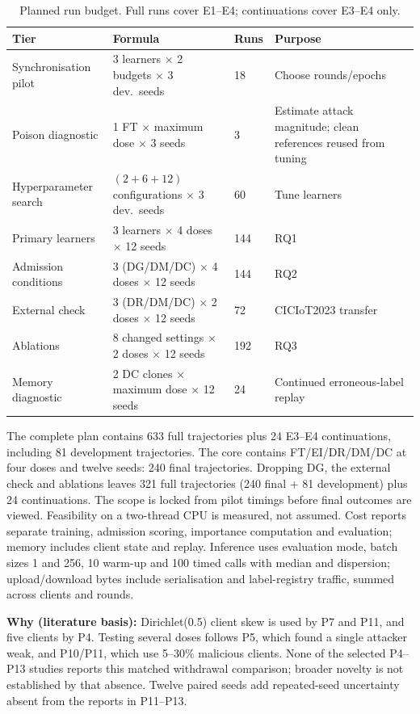 \documentclass[10pt,a4paper]{article}
\newcommand{\why}[1]{\par\nopagebreak[4]\noindent\colorbox{black!5}{\parbox{\dimexpr\linewidth-2\fboxsep}{\small\textbf{Why (literature basis):} #1}}\par}
\begin{document}
\begin{table}[H]
\centering\footnotesize
\caption{Planned run budget. Full runs cover E1--E4; continuations cover E3--E4 only.}
\label{tab:budget}
\begin{tabularx}{\linewidth}{L{3.6cm}L{5.4cm}L{1.0cm}Y}
\toprule
Tier & Formula & Runs & Purpose\\
\midrule
Synchronisation pilot & 3 learners $\times$ 2 budgets $\times$ 3 dev.\ seeds & 18 & Choose rounds/epochs\\
Poison diagnostic & 1 FT $\times$ maximum dose $\times$ 3 seeds & 3 & Estimate attack magnitude; clean references reused from tuning\\
Hyperparameter search & $(2+6+12)$ configurations $\times$ 3 dev.\ seeds & 60 & Tune learners\\
Primary learners & 3 learners $\times$ 4 doses $\times$ 12 seeds & 144 & RQ1\\
Admission conditions & 3 (DG/DM/DC) $\times$ 4 doses $\times$ 12 seeds & 144 & RQ2\\
External check & 3 (DR/DM/DC) $\times$ 2 doses $\times$ 12 seeds & 72 & CICIoT2023 transfer\\
Ablations & 8 changed settings $\times$ 2 doses $\times$ 12 seeds & 192 & RQ3\\
Memory diagnostic & 2 DC clones $\times$ maximum dose $\times$ 12 seeds & 24 & Continued erroneous-label replay\\
\bottomrule
\end{tabularx}
\end{table}
The complete plan contains 633 full trajectories plus 24 E3--E4 continuations, including 81 development trajectories. The core contains FT/EI/DR/DM/DC at four doses and twelve seeds: 240 final trajectories. Dropping DG, the external check and ablations leaves 321 full trajectories (240 final + 81 development) plus 24 continuations. The scope is locked from pilot timings before final outcomes are viewed. Feasibility on a two-thread CPU is measured, not assumed. Cost reports separate training, admission scoring, importance computation and evaluation; memory includes client state and replay. Inference uses evaluation mode, batch sizes 1 and 256, 10 warm-up and 100 timed calls with median and dispersion; upload/download bytes include serialisation and label-registry traffic, summed across clients and rounds.

\why{Dirichlet(0.5) client skew is used by P7 and P11, and five clients by P4. Testing several doses follows P5, which found a single attacker weak, and P10/P11, which use 5--30\% malicious clients. None of the selected P4--P13 studies reports this matched withdrawal comparison; broader novelty is not established by that absence. Twelve paired seeds add repeated-seed uncertainty absent from the reports in P11--P13.}
\end{document}

